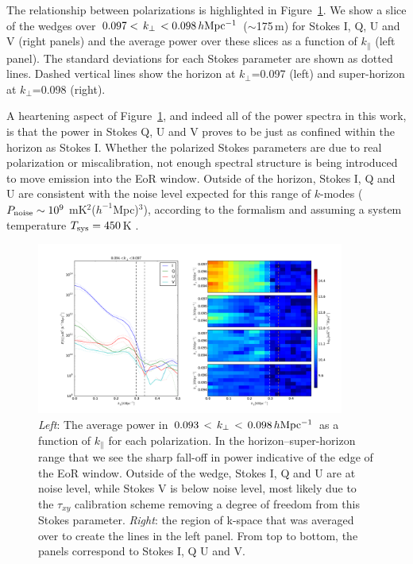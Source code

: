 The relationship between polarizations is highlighted in Figure~\ref{fig:psa32_high_kperp_slice}.
We show a slice of the wedges over $0.097<\,k_{\perp}\,<0.098\,h{\rm Mpc^{-1}}$ ($\sim$175\,m) for Stokes I, Q, U and V (right panels) and the average power over these slices as a function of $k_{\parallel}$ (left panel). The standard deviations for each Stokes parameter are shown as dotted lines. 
Dashed vertical lines show the horizon at $k_{\perp}$=0.097 (left) and super-horizon at $k_{\perp}$=0.098 (right).

A heartening aspect of Figure~\ref{fig:psa32_high_kperp_slice}, and indeed all of the power spectra in this work, is that the power in Stokes Q, U and V proves to be just as confined within the horizon as Stokes I. Whether the polarized Stokes parameters are due to real polarization or miscalibration, not enough spectral structure is being introduced to move emission into the EoR window. Outside of the horizon, Stokes I, Q and U are consistent with the noise level expected for this range of $k$-modes ($P_{\rm noise}\sim10^{9}$ mK$^2$($h^{-1}$Mpc)$^3$), according to the formalism \citet{Parsons.12b} and assuming a system temperature $T_{\rm sys}=450\,$K \citep[e.g.][]{Moore.17}.

\begin{figure}
\centering
\includegraphics[width=0.9\textwidth]{chapters/eor_window_PAPER/figures/high_kperp_with_imshow_errorbars_title.pdf}
\caption[Average power in $0.093\,<\,k_{\perp}\,<\,0.098\,h{\rm Mpc^{-1}}$ as a function of $k_{\parallel}$ for each polarization of PAPER-32 data.]{\textit{Left}: The average power in $0.093\,<\,k_{\perp}\,<\,0.098\,h{\rm Mpc^{-1}}$ as a function of $k_{\parallel}$ for each polarization.  In the horizon--super-horizon range that we see the sharp fall-off in power indicative of the edge of the EoR window. 
Outside of the wedge, Stokes I, Q and U are at noise level, while Stokes V is below noise level, most likely due to the $\tau_{xy}$ calibration scheme removing a degree of freedom from this Stokes parameter. \textit{Right}: the region of k-space that was averaged over to create the lines in the left panel. From top to bottom, the panels correspond to Stokes I, Q U and V.}
\label{fig:psa32_high_kperp_slice}
\end{figure}

